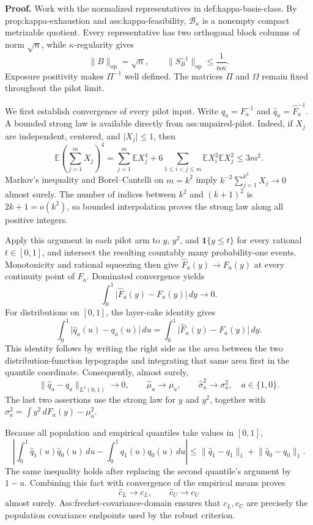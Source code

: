 \textbf{Proof.}
Work with the normalized representatives in def:kappa-basis-class.  By prop:kappa-exhaustion and ass:kappa-feasibility, \(\mathcal B_\kappa\) is a nonempty compact metrizable quotient.  Every representative has two orthogonal block columns of norm \(\sqrt n\), while \(\kappa\)-regularity gives
\[
 \lVert B\rVert_{\mathrm{op}}=\sqrt n,
 \qquad
 \lVert S_B^{-1}\rVert_{\mathrm{op}}\le \frac{1}{n\kappa}.
 \tag{1}
\]
Exposure positivity makes \(\Pi^{-1}\) well defined.  The matrices \(\Pi\) and \(\Omega\) remain fixed throughout the pilot limit.

We first establish convergence of every pilot input.  Write \(q_a=F_a^{-1}\) and \(\widehat q_a=\widehat F_a^{-1}\).  A bounded strong law is available directly from ass:unpaired-pilot.  Indeed, if \(X_j\) are independent, centered, and \(\lvert X_j\rvert\le1\), then
\[
 \mathbb E\!\left(\sum_{j=1}^mX_j\right)^4
 =\sum_{j=1}^m\mathbb E X_j^4
 +6\sum_{1\le i<j\le m}\mathbb E X_i^2\mathbb E X_j^2
 \le 3m^2.
\]
Markov's inequality and Borel--Cantelli on \(m=k^2\) imply \(k^{-2}\sum_{j=1}^{k^2}X_j\to0\) almost surely.  The number of indices between \(k^2\) and \((k+1)^2\) is \(2k+1=o(k^2)\), so bounded interpolation proves the strong law along all positive integers.

Apply this argument in each pilot arm to \(y\), \(y^2\), and \(\mathbf1\{y\le t\}\) for every rational \(t\in[0,1]\), and intersect the resulting countably many probability-one events.  Monotonicity and rational squeezing then give \(\widehat F_a(y)\to F_a(y)\) at every continuity point of \(F_a\).  Dominated convergence yields
\[
 \int_0^1\lvert\widehat F_a(y)-F_a(y)\rvert\,dy\longrightarrow0.
\]
For distributions on \([0,1]\), the layer-cake identity gives
\[
 \int_0^1\lvert\widehat q_a(u)-q_a(u)\rvert\,du
 =\int_0^1\lvert\widehat F_a(y)-F_a(y)\rvert\,dy.
\]
This identity follows by writing the right side as the area between the two distribution-function hypographs and integrating that same area first in the quantile coordinate.  Consequently, almost surely,
\[
 \lVert\widehat q_a-q_a\rVert_{L^1(0,1)}\to0,
 \qquad
 \widehat\mu_a\to\mu_a,
 \qquad
 \widehat\sigma_a^2\to\sigma_a^2,
 \quad a\in\{1,0\}.
 \tag{2}
\]
The last two assertions use the strong law for \(y\) and \(y^2\), together with \(\sigma_a^2=\int y^2\,dF_a(y)-\mu_a^2\).

Because all population and empirical quantiles take values in \([0,1]\),
\[
 \left\lvert
 \int_0^1\widehat q_1(u)\widehat q_0(u)\,du
 -\int_0^1q_1(u)q_0(u)\,du
 \right\rvert
 \le
 \lVert\widehat q_1-q_1\rVert_1
 +\lVert\widehat q_0-q_0\rVert_1.
\]
The same inequality holds after replacing the second quantile's argument by \(1-u\).  Combining this fact with convergence of the empirical means proves
\[
 \widehat c_L\to c_L,
 \qquad
 \widehat c_U\to c_U
 \tag{3}
\]
almost surely.  Ass:frechet-covariance-domain ensures that \(c_L,c_U\) are precisely the population covariance endpoints used by the robust criterion.

